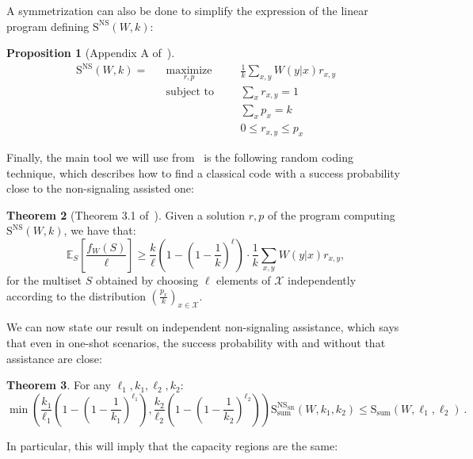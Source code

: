 \documentclass[11pt]{article}
\theoremstyle{definition}
\newtheorem{theo}{Theorem}[section]
\newtheorem{prop}[theo]{Proposition}
\theoremstyle{remark}
\DeclareMathOperator{\maxi}{\text{maximize}}
\DeclareMathOperator{\st}{\text{subject to}}
\begin{document}
A symmetrization can also be done to simplify the expression of the linear program defining $\mathrm{S}^{\mathrm{NS}}(W,k)$:

\begin{prop}[Appendix A of~\cite{BF18}]
  \label{prop:NSonewayLP}
  \begin{equation}
    \begin{aligned}
      \mathrm{S}^{\mathrm{NS}}(W,k) = &&\underset{r,p}{\maxi} &&& \frac{1}{k} \sum_{x,y} W(y|x)r_{x,y}\\
      &&\st &&& \sum_{x} r_{x,y} = 1\\
      &&&&& \sum_{x} p_{x} = k\\
      &&&&& 0 \leq r_{x,y} \leq p_{x}
    \end{aligned}
  \end{equation}
\end{prop}

Finally, the main tool we will use from~\cite{BF18} is the following random coding technique, which describes how to find a classical code with a success probability close to the non-signaling assisted one:
\begin{theo}[Theorem 3.1 of~\cite{BF18}]
  \label{theo:RandomCoding}
  Given a solution $r,p$ of the program computing $\mathrm{S}^{\mathrm{NS}}(W,k)$, we have that:
  \[ \mathbb{E}_S\left[\frac{f_W(S)}{\ell}\right] \geq \frac{k}{\ell}\left(1-\left(1-\frac{1}{k}\right)^{\ell}\right) \cdot \frac{1}{k} \sum_{x,y} W(y|x)r_{x,y} , \]
  for the multiset $S$ obtained by choosing $\ell$ elements of $\mathcal{X}$ independently according to the distribution $\left(\frac{p_{x}}{k}\right)_{x \in \mathcal{X}}$.
\end{theo}

We can now state our result on independent non-signaling assistance, which says that even in one-shot scenarios, the success probability with and without that assistance are close:

\begin{theo}
  \label{theo:NSsr}
  For any $\ell_1,k_1,\ell_2,k_2$:
  \[ \min\left(\frac{k_1}{\ell_1}\left(1-\left(1-\frac{1}{k_1}\right)^{\ell_1}\right),\frac{k_2}{\ell_2}\left(1-\left(1-\frac{1}{k_2}\right)^{\ell_2}\right)\right)\mathrm{S}_{\text{sum}}^{\mathrm{NS}_{\mathrm{SR}}}(W,k_1,k_2) \leq \mathrm{S}_{\text{sum}}(W,\ell_1,\ell_2)\ . \]
\end{theo}

In particular, this will imply that the capacity regions are the same:
\end{document}
